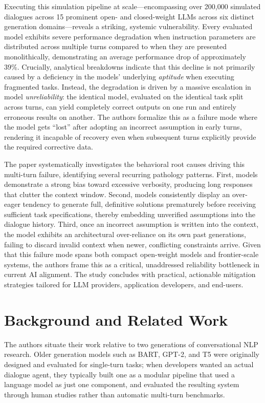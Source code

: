 \documentclass[manuscript,review]{acmart}
\begin{document}
Executing this simulation pipeline at scale—encompassing over 200,000 simulated dialogues across 15 prominent open- and closed-weight LLMs across six distinct generation domains—reveals a striking, systemic vulnerability. Every evaluated model exhibits severe performance degradation when instruction parameters are distributed across multiple turns compared to when they are presented monolithically, demonstrating an average performance drop of approximately 39\%. Crucially, analytical breakdowns indicate that this decline is not primarily caused by a deficiency in the models' underlying \emph{aptitude} when executing fragmented tasks. Instead, the degradation is driven by a massive escalation in model \emph{unreliability}: the identical model, evaluated on the identical task split across turns, can yield completely correct outputs on one run and entirely erroneous results on another. The authors formalize this as a failure mode where the model gets ``lost'' after adopting an incorrect assumption in early turns, rendering it incapable of recovery even when subsequent turns explicitly provide the required corrective data.

The paper systematically investigates the behavioral root causes driving this multi-turn failure, identifying several recurring pathology patterns. First, models demonstrate a strong bias toward excessive verbosity, producing long responses that clutter the context window. Second, models consistently display an over-eager tendency to generate full, definitive solutions prematurely before receiving sufficient task specifications, thereby embedding unverified assumptions into the dialogue history. Third, once an incorrect assumption is written into the context, the model exhibits an architectural over-reliance on its own past generations, failing to discard invalid context when newer, conflicting constraints arrive. Given that this failure mode spans both compact open-weight models and frontier-scale systems, the authors frame this as a critical, unaddressed reliability bottleneck in current AI alignment. The study concludes with practical, actionable mitigation strategies tailored for LLM providers, application developers, and end-users.


\section{Background and Related Work}

The authors situate their work relative to two generations of conversational NLP research. Older
generation models such as BART, GPT-2, and T5 were originally designed and evaluated for single-turn
tasks; when developers wanted an actual dialogue agent, they typically built one as a modular pipeline
that used a language model as just one component, and evaluated the resulting system through human
studies rather than automatic multi-turn benchmarks.
 
\end{document}
